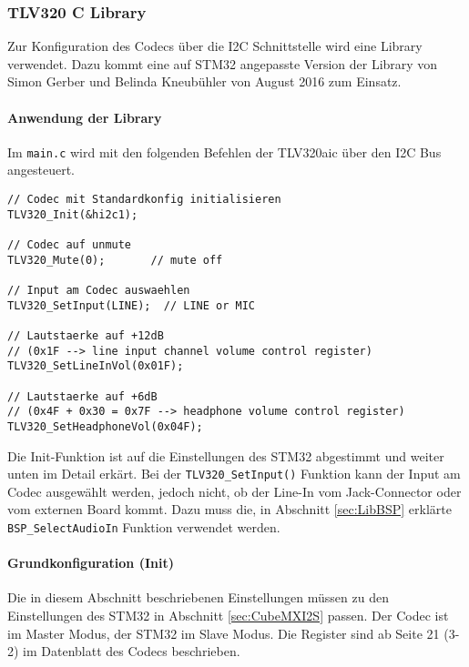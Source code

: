 \subsubsection{TLV320 C Library}
\label{sec:Library_tlv320}

Zur Konfiguration des Codecs über die I2C Schnittstelle wird eine Library verwendet.
Dazu kommt eine auf STM32 angepasste Version der Library von Simon Gerber und Belinda Kneubühler von August 2016 zum Einsatz.

\paragraph{Anwendung der Library}

Im \texttt{main.c} wird mit den folgenden Befehlen der TLV320aic über den I2C Bus angesteuert.

\begin{lstlisting}[style=Cuvision,caption={TLV320 Funktionen}]
// Codec mit Standardkonfig initialisieren
TLV320_Init(&hi2c1);

// Codec auf unmute
TLV320_Mute(0);       // mute off

// Input am Codec auswaehlen
TLV320_SetInput(LINE);  // LINE or MIC

// Lautstaerke auf +12dB  
// (0x1F --> line input channel volume control register)
TLV320_SetLineInVol(0x01F);

// Lautstaerke auf +6dB 
// (0x4F + 0x30 = 0x7F --> headphone volume control register)
TLV320_SetHeadphoneVol(0x04F);

\end{lstlisting}

Die Init-Funktion ist auf die Einstellungen des STM32 abgestimmt und weiter unten im Detail erkärt. 
Bei der \texttt{TLV320\_SetInput()} Funktion kann der Input am Codec ausgewählt werden, jedoch nicht, ob der Line-In vom Jack-Connector oder vom externen Board kommt. 
Dazu muss die, in Abschnitt \ref{sec:LibBSP} erklärte \texttt{BSP\_SelectAudioIn} Funktion verwendet werden.


\paragraph{Grundkonfiguration (Init)}

Die in diesem Abschnitt beschriebenen Einstellungen müssen zu den Einstellungen des STM32 in Abschnitt \ref{sec:CubeMXI2S} passen. Der Codec ist im Master Modus, der STM32 im Slave Modus. Die Register sind ab Seite 21 (3-2) im Datenblatt des Codecs beschrieben. \cite{tlv320}

